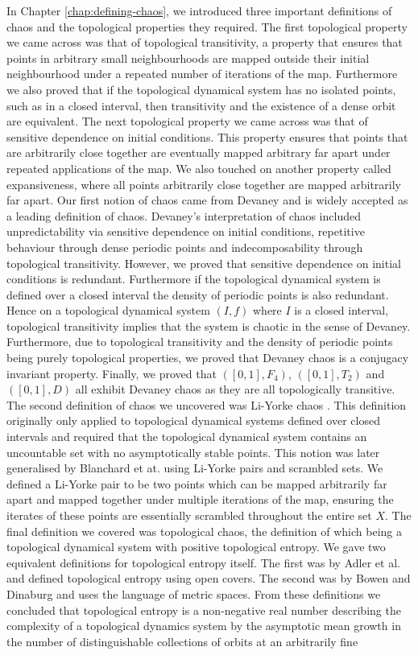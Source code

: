 In Chapter \ref{chap:defining-chaos}, we introduced three important definitions of chaos and the topological properties they required. The first topological property we came across was that of topological transitivity, a property that ensures that points in arbitrary small neighbourhoods are mapped outside their initial neighbourhood under a repeated number of iterations of the map. Furthermore we also proved that if the topological dynamical system has no isolated points, such as in a closed interval, then transitivity and the existence of a dense orbit are equivalent. The next topological property we came across was that of sensitive dependence on initial conditions. This property ensures that points that are arbitrarily close together are eventually mapped arbitrary far apart under repeated applications of the map. We also touched on another property called expansiveness, where all points arbitrarily close together are mapped arbitrarily far apart. Our first notion of chaos came from Devaney \cite{devaney} and is widely accepted as a leading definition of chaos. Devaney's interpretation of chaos included unpredictability via sensitive dependence on initial conditions, repetitive behaviour through dense periodic points and indecomposability through topological transitivity. However, we proved that sensitive dependence on initial conditions is redundant. Furthermore if the topological dynamical system is defined over a closed interval the density of periodic points is also redundant. Hence on a topological dynamical system $(I, f)$ where $I$ is a closed interval, topological transitivity implies that the system is chaotic in the sense of Devaney. Furthermore, due to topological transitivity and the density of periodic points being purely topological properties, we proved that Devaney chaos is a conjugacy invariant property. Finally, we proved that $([0, 1], F_4)$, $([0, 1], T_2)$ and $([0, 1], D)$ all exhibit Devaney chaos as they are all topologically transitive. The second definition of chaos we uncovered was Li-Yorke chaos \cite{li-yorke}. This definition originally only applied to topological dynamical systems defined over closed intervals and required that the topological dynamical system contains an uncountable set with no asymptotically stable points. This notion was later generalised by Blanchard et at.\cite{blanchard} using Li-Yorke pairs and scrambled sets. We defined a Li-Yorke pair to be two points which can be mapped arbitrarily far apart and mapped together under multiple iterations of the map, ensuring the iterates of these points are essentially scrambled throughout the entire set $X$. The final definition we covered was topological chaos, the definition of which being a topological dynamical system with positive topological entropy. We gave two equivalent definitions for topological entropy itself. The first was by Adler et al.\cite{adler} and defined topological entropy using open covers. The second was by Bowen and Dinaburg \cite{bowen} \cite{dinaburg} and uses the language of metric spaces. From these definitions we concluded that topological entropy is a non-negative real number describing the complexity of a topological dynamics system by the asymptotic mean growth in the number of distinguishable collections of orbits at an arbitrarily fine 